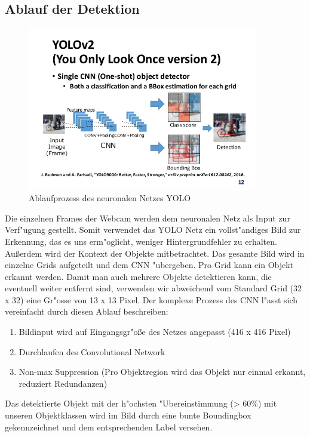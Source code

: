 \subsection{Ablauf der Detektion}

\begin{figure}[h]
	\centering
	\includegraphics[width=0.9\textwidth,trim={1.2cm 1cm 1cm 6.3cm},clip]{images/yolo_schaubild}
	\caption{Ablaufprozess des neuronalen Netzes YOLO}
	\label{fig:yolo}
\end{figure}

Die einzelnen Frames der Webcam werden dem neuronalen Netz als Input zur Verf"ugung gestellt. Somit verwendet das YOLO Netz ein vollst"andiges Bild zur Erkennung, das es uns erm"oglicht, weniger Hintergrundfehler zu erhalten. Au\ss erdem wird der Kontext der Objekte mitbetrachtet. Das gesamte Bild wird in einzelne Grids aufgeteilt und dem CNN "ubergeben. Pro Grid kann ein Objekt erkannt werden. Damit man auch mehrere Objekte detektieren kann, die eventuell weiter entfernt sind, verwenden wir abweichend vom Standard Grid (32 x 32) eine Gr"osse von 13 x 13 Pixel. Der komplexe Prozess des CNN l"asst sich vereinfacht durch diesen Ablauf beschreiben:

\begin{enumerate}
	\item Bildinput wird auf Eingangsgr"o\ss e des Netzes angepasst (416 x 416 Pixel)
	\item Durchlaufen des Convolutional Network
	\item Non-max Suppression (Pro Objektregion wird das Objekt nur einmal erkannt, reduziert Redundanzen) 
\end{enumerate}

Das detektierte Objekt mit der h"ochsten "Ubereinstimmung (> 60\%) mit unseren Objektklassen wird im Bild durch eine bunte Boundingbox gekennzeichnet und dem entsprechenden Label versehen.

